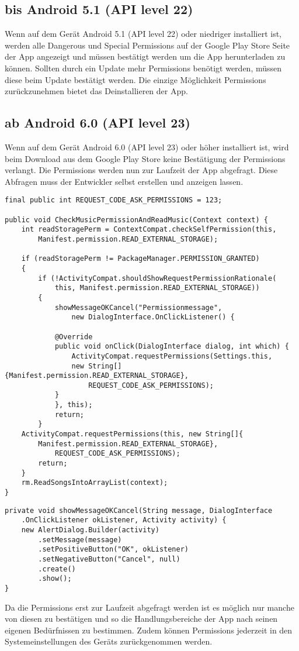 \documentclass[FIPLY_base.tex]{subfiles}
\begin{document}
\newpage
\subsection{bis Android 5.1 (API level 22)}
Wenn auf dem Gerät Android 5.1 (API level 22) oder niedriger installiert ist, werden alle Dangerous und Special Permissions auf der Google Play Store Seite der App angezeigt 
und müssen bestätigt werden um die App herunterladen zu können. 
Sollten durch ein Update mehr Permissions benötigt werden, müssen diese beim Update bestätigt werden. 
Die einzige Möglichkeit Permissions zurückzunehmen bietet das Deinstallieren der App.

\subsection{ab Android 6.0 (API level 23)}
Wenn auf dem Gerät Android 6.0 (API level 23) oder höher installiert ist, wird beim Download aus dem Google Play Store keine Bestätigung der Permissions verlangt.
Die Permissions werden nun zur Laufzeit der App abgefragt. Diese Abfragen muss der Entwickler selbst erstellen und anzeigen lassen.

\begin{lstlisting}
final public int REQUEST_CODE_ASK_PERMISSIONS = 123;

public void CheckMusicPermissionAndReadMusic(Context context) {
	int readStoragePerm = ContextCompat.checkSelfPermission(this, 
		Manifest.permission.READ_EXTERNAL_STORAGE);

	if (readStoragePerm != PackageManager.PERMISSION_GRANTED) 
	{
		if (!ActivityCompat.shouldShowRequestPermissionRationale(
			this, Manifest.permission.READ_EXTERNAL_STORAGE)) 
		{
			showMessageOKCancel("Permissionmessage", 
				new DialogInterface.OnClickListener() {
				
			@Override
			public void onClick(DialogInterface dialog, int which) {
				ActivityCompat.requestPermissions(Settings.this,
				new String[]{Manifest.permission.READ_EXTERNAL_STORAGE},
					REQUEST_CODE_ASK_PERMISSIONS);
			}
			}, this);
			return;
		}
	ActivityCompat.requestPermissions(this, new String[]{
		Manifest.permission.READ_EXTERNAL_STORAGE}, 
			REQUEST_CODE_ASK_PERMISSIONS);
		return;
	}
	rm.ReadSongsIntoArrayList(context);
}
\end{lstlisting}

\begin{lstlisting}
private void showMessageOKCancel(String message, DialogInterface
	.OnClickListener okListener, Activity activity) {
	new AlertDialog.Builder(activity)
		.setMessage(message)
		.setPositiveButton("OK", okListener)
		.setNegativeButton("Cancel", null)
		.create()
		.show();
}
\end{lstlisting}
Da die Permissions erst zur Laufzeit abgefragt werden ist es möglich nur manche von diesen zu bestätigen und so die Handlungsbereiche der App nach seinen eigenen Bedürfnissen zu bestimmen.
Zudem können Permissions jederzeit in den Systemeinstellungen des Geräts zurückgenommen werden.
\end{document}

